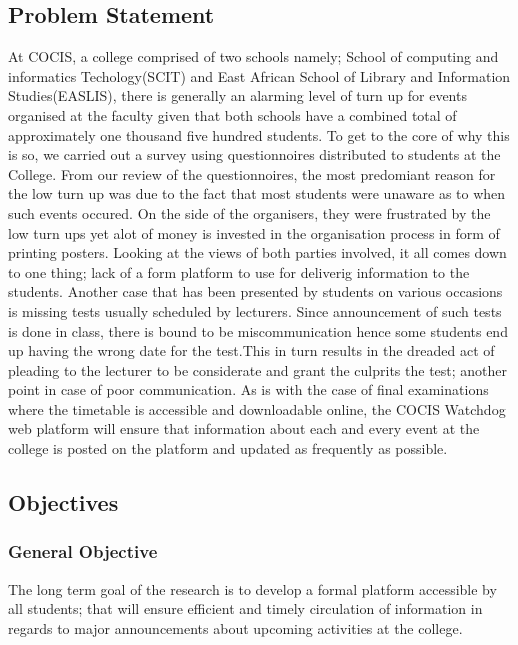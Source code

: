 \documentclass{article}
\begin{document}
\subsection{Problem Statement}
At COCIS, a college comprised of two schools namely; School of computing and informatics Techology(SCIT) and East African School of Library and Information Studies(EASLIS), there is generally an alarming level of turn up for events organised at the faculty given that both schools have a combined total of approximately one thousand five hundred students. To get to the core of why this is so, we carried out a survey using questionnoires distributed to students at the College. From our review of the questionnoires, the most predomiant reason for the low turn up was due to the fact that most students were unaware as to when such events occured. On the side of the organisers, they were frustrated by the low turn ups yet alot of money is invested in the organisation process in form of printing posters. Looking at the views of both parties involved, it all comes down to one thing; lack of a form platform to use for deliverig information to the students.
Another case that has been presented by students on various occasions is missing tests usually scheduled by lecturers. Since announcement of such tests is done in class, there is bound to be miscommunication hence some students end up having the wrong date for the test.This in turn results in the dreaded act of pleading to the lecturer to be considerate and grant the culprits the test; another point in case of poor communication.
As is with the case of final examinations where the timetable is accessible and downloadable online, the COCIS Watchdog web platform will ensure that information about each and every event at the college is posted on the platform and updated as frequently as possible.
    

\subsection{Objectives}

\subsubsection{General Objective}
The long term goal of the research is to develop a formal platform accessible by all students; that will ensure efficient and timely circulation of information in regards to major announcements about upcoming activities at the college. 
\end{document}
